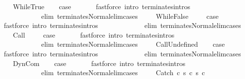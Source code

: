 \begin{isabellebody}
\isamarkupfalse%
\isanewline
\ \ \isamarkupfalse%
\ WhileTrue\isanewline
\ \ \isamarkupfalse%
\ {\isacharquery}case\ \isanewline
\ \ \ \ \isamarkupfalse%
\ {\isacharparenleft}fastforce\ intro{\isacharcolon}\ terminates{\isachardot}intros\ \isanewline
\ \ \ \ \ \ \ \ \ \ \ \ elim{\isacharcolon}\ terminates{\isacharunderscore}Normal{\isacharunderscore}elim{\isacharunderscore}cases\ {\isacharparenright}\isanewline
{}\isamarkupfalse%
\isanewline
\ \ \isamarkupfalse%
\ WhileFalse\ \isanewline
\ \ \isamarkupfalse%
\ {\isacharquery}case\ \isanewline
\ \ \ \ \isamarkupfalse%
\ {\isacharparenleft}fastforce\ intro{\isacharcolon}\ terminates{\isachardot}intros\ \isanewline
\ \ \ \ \ \ \ \ \ \ \ \ elim{\isacharcolon}\ terminates{\isacharunderscore}Normal{\isacharunderscore}elim{\isacharunderscore}cases\ {\isacharparenright}\isanewline
{}\isamarkupfalse%
\isanewline
\ \ \isamarkupfalse%
\ Call\ \isanewline
\ \ \isamarkupfalse%
\ {\isacharquery}case\ \isanewline
\ \ \ \ \isamarkupfalse%
\ {\isacharparenleft}fastforce\ intro{\isacharcolon}\ terminates{\isachardot}intros\ \isanewline
\ \ \ \ \ \ \ \ \ \ \ \ elim{\isacharcolon}\ terminates{\isacharunderscore}Normal{\isacharunderscore}elim{\isacharunderscore}cases\ {\isacharparenright}\isanewline
{}\isamarkupfalse%
\isanewline
\ \ \isamarkupfalse%
\ CallUndefined\isanewline
\ \ \isamarkupfalse%
\ {\isacharquery}case\ \isanewline
\ \ \ \ \isamarkupfalse%
\ {\isacharparenleft}fastforce\ intro{\isacharcolon}\ terminates{\isachardot}intros\ \isanewline
\ \ \ \ \ \ \ \ \ \ \ \ elim{\isacharcolon}\ terminates{\isacharunderscore}Normal{\isacharunderscore}elim{\isacharunderscore}cases\ {\isacharparenright}\isanewline
{}\isamarkupfalse%
\isanewline
\ \ \isamarkupfalse%
\ DynCom\isanewline
\ \ \isamarkupfalse%
\ {\isacharquery}case\ \isanewline
\ \ \ \ \isamarkupfalse%
\ {\isacharparenleft}fastforce\ intro{\isacharcolon}\ terminates{\isachardot}intros\ \isanewline
\ \ \ \ \ \ \ \ \ \ \ \ elim{\isacharcolon}\ terminates{\isacharunderscore}Normal{\isacharunderscore}elim{\isacharunderscore}cases\ {\isacharparenright}\isanewline
{}\isamarkupfalse%
\isanewline
\ \ \isamarkupfalse%
\ {\isacharparenleft}Catch\ c\ s\ c\ s{\isacharprime}\ c\ \isamarkupfalse%

\end{isabellebody}
